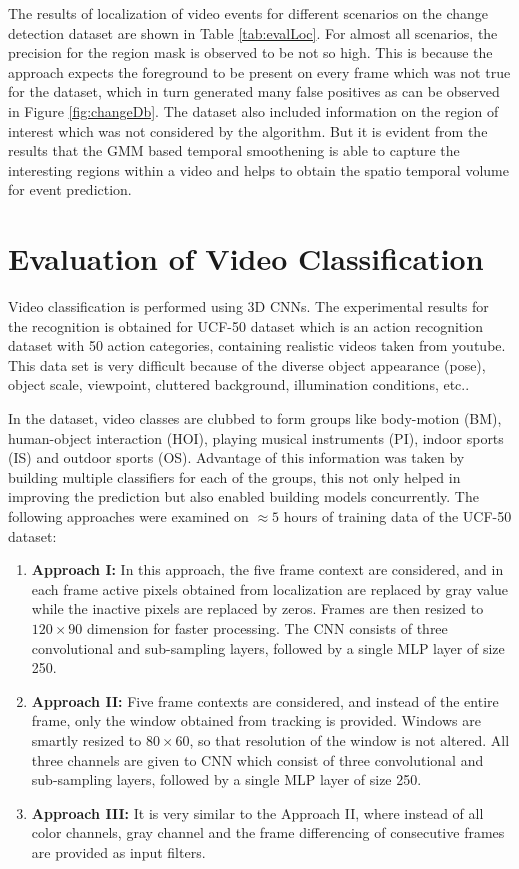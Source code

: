 \par The results of localization of video events for different scenarios on the change detection dataset are shown in Table \ref{tab:evalLoc}. For almost all scenarios, the precision for the region mask is observed to be not so high. This is because the approach expects the foreground to be present on every frame which was not true for the dataset, which in turn generated many false positives as can be observed in Figure \ref{fig:changeDb}.  The dataset also included information on the region of interest which was not considered by the algorithm.  But it is evident from the results that the GMM based temporal smoothening is able to capture the interesting regions within a video and helps to obtain the spatio temporal volume for event prediction.

\section{Evaluation of Video Classification} 
\label{sec:EvVS}
Video classification is performed using 3D CNNs.  The experimental results for the recognition is obtained for UCF-50 dataset which is an action recognition dataset with 50 action categories,	 containing realistic videos taken from youtube.  This data set is very difficult because of the diverse object appearance (pose), object scale, viewpoint, cluttered background, illumination conditions, etc..
\par In the dataset, video classes are clubbed to form groups like body-motion (BM), human-object interaction (HOI), playing musical instruments (PI), indoor sports (IS) and outdoor sports (OS).   Advantage of this information was taken by building multiple classifiers for each of the groups, this not only helped in improving the prediction but also enabled building models concurrently. The following approaches were examined on $\approx{5}$ hours of training data of the UCF-50 dataset:
\begin{enumerate}
	\item{\textbf{Approach I:} In this approach, the five frame context are considered, and in each frame active pixels obtained from localization are replaced by gray value while the inactive pixels are replaced by zeros.  Frames are then resized to $120 \times 90$ dimension for faster processing.  The CNN consists of three convolutional and sub-sampling layers,  followed by a single MLP layer of size 250.}
	\item{\textbf{Approach II:} Five frame contexts are considered, and instead of the entire frame, only the window obtained from tracking is provided.  Windows are smartly resized to $80 \times 60$, so that resolution of the window is not altered.  All three channels are given to CNN which consist of three convolutional and sub-sampling layers, followed by a single MLP layer of size 250.}
	\item{\textbf{Approach III:} It is very similar to the Approach II, where instead of all color channels, gray channel and the frame differencing of consecutive frames are provided as input filters.}	
\end{enumerate}
